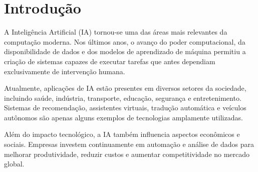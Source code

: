 \section{Introdução}

A Inteligência Artificial (IA) tornou-se uma das áreas mais relevantes da computação moderna.
Nos últimos anos, o avanço do poder computacional, da disponibilidade de dados e dos modelos
de aprendizado de máquina permitiu a criação de sistemas capazes de executar tarefas que
antes dependiam exclusivamente de intervenção humana.

Atualmente, aplicações de IA estão presentes em diversos setores da sociedade, incluindo saúde,
indústria, transporte, educação, segurança e entretenimento. Sistemas de recomendação,
assistentes virtuais, tradução automática e veículos autônomos são apenas alguns exemplos
de tecnologias amplamente utilizadas.

Além do impacto tecnológico, a IA também influencia aspectos econômicos e sociais. Empresas
investem continuamente em automação e análise de dados para melhorar produtividade,
reduzir custos e aumentar competitividade no mercado global. 
